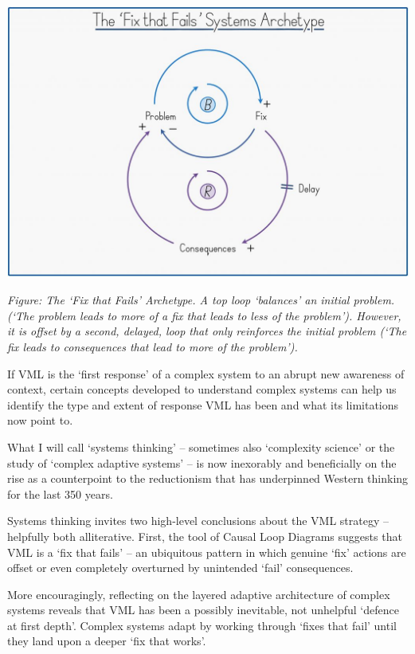 \documentclass[
]{book}
\begin{document}
\includegraphics{fig/austin_fix_fails.jpg}

\emph{Figure: The `Fix that Fails' Archetype. A top loop `balances' an initial problem.
(`The problem leads to more of a fix that leads to less of the problem'). However, it is
offset by a second, delayed, loop that only reinforces the initial problem (`The fix
leads to consequences that lead to more of the problem').}

If VML is the `first response' of a complex system to an abrupt new awareness of context, certain
concepts developed to understand complex systems can help us identify the type and extent of
response VML has been and what its limitations now point to.

What I will call `systems thinking' -- sometimes also `complexity science' or the study of `complex
adaptive systems' -- is now inexorably and beneficially on the rise as a counterpoint to the
reductionism that has underpinned Western thinking for the last 350 years.

Systems thinking invites two high-level conclusions about the VML strategy -- helpfully both
alliterative. First, the tool of Causal Loop Diagrams suggests that VML is a `fix that fails' -- an
ubiquitous pattern in which genuine `fix' actions are offset or even completely overturned by
unintended `fail' consequences.

More encouragingly, reflecting on the layered adaptive architecture of complex systems reveals that
VML has been a possibly inevitable, not unhelpful `defence at first depth'. Complex systems adapt
by working through `fixes that fail' until they land upon a deeper `fix that works'.
\end{document}

